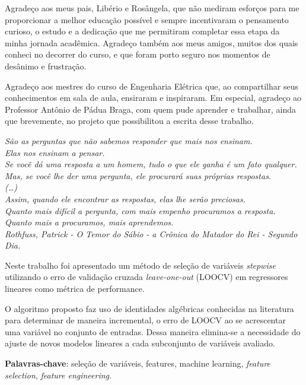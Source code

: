 \documentclass[
	12pt,				%
	openright,			%
	twoside,			%
	a4paper,			%
	english,			%
	german,				%
	brazil				%
	]{abntex2}
\begin{document}
\begin{agradecimentos}

	Agradeço aos meus pais, Libério e Rosângela, que não mediram esforços para me proporcionar a melhor educação possível e sempre incentivaram o pensamento curioso, o estudo e a dedicação que me permitiram completar essa etapa da minha jornada acadêmica. Agradeço também aos meus amigos, muitos dos quais conheci no decorrer do curso, e que foram porto seguro nos momentos de desânimo e frustração.

	Agradeço aos mestres do curso de Engenharia Elétrica que, ao compartilhar seus conhecimentos em sala de aula, ensiraram e inspiraram. Em especial, agradeço ao Professor Antônio de Pádua Braga, com quem pude aprender e trabalhar, ainda que brevemente, no projeto que possibilitou a escrita desse trabalho.

\end{agradecimentos}

\begin{epigrafe}
    \vspace*{\fill}
	\begin{flushright}
		\textit{São as perguntas que não sabemos responder que mais nos ensinam. \\
		Elas nos ensinam a pensar. \\
		Se você dá uma resposta a um homem, tudo o que ele ganha é um fato qualquer. \\
		Mas, se você lhe der uma pergunta, ele procurará suas próprias respostas. \\
		(…) \\
        Assim, quando ele encontrar as respostas, elas lhe serão preciosas. \\
        Quanto mais difícil a pergunta, com mais empenho procuramos a resposta. \\
        Quanto mais a procuramos, mais aprendemos. \\
        Rothfuss, Patrick - O Temor do Sábio - a Crônica do Matador do Rei - Segundo Dia.}
	\end{flushright}
\end{epigrafe}


\setlength{\absparsep}{18pt} %
\begin{resumo}
	Neste trabalho foi apresentado um método de seleção de variáveis \textit{stepwise} utilizando o erro de validação cruzada \textit{leave-one-out} (LOOCV) em regressores lineares como métrica de performance. 
	
	O algoritmo proposto faz uso de identidades algébricas conhecidas na literatura para determinar de maneira incremental, o erro de LOOCV ao se acrescentar uma variável no conjunto de entradas. Dessa maneira elimina-se a necessidade do ajuste de novos modelos lineares a cada subconjunto de variáveis avaliado.

 \textbf{Palavras-chave}: seleção de variáveis, features, machine learning, \textit{feature selection}, \textit{feature engineering}.
\end{resumo}
\end{document}
